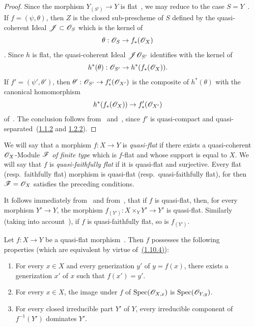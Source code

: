 \begin{proof}
Since the morphism $Y_{(S')}\to Y$ is flat~, we may reduce to the case $S=Y$~.
If $f=(\psi,\theta)$, then $Z$ is the closed sub-prescheme of $S$ defined by the quasi-coherent Ideal $\mathscr{J}\subset\mathscr{O}_S$ which is the kernel of
\[
  \theta:\mathscr{O}_S\to f_*(\mathscr{O}_X)
\]
.
Since $h$ is flat, the quasi-coherent Ideal $\mathscr{J}\mathscr{O}_{S'}$ identifies with the kernel of
\[
  h^*(\theta):\mathscr{O}_{S'}\to h^*(f_*(\mathscr{O}_X)).
\]
If $f'=(\psi',\theta')$, then $\theta':\mathscr{O}_{S'}\to f'_*(\mathscr{O}_{X'})$ is the composite of $h^*(\theta)$ with the canonical homomorphism
\[
  h^*(f_*(\mathscr{O}_X))\to f'_*(\mathscr{O}_{X'})
\]
of~.
The conclusion follows from~ and~, since $f'$ is quasi-compact and quasi-separated~({\hyperref[IV.1.1.2]{1.1.2}} and {\hyperref[IV.1.2.2]{1.2.2}}).
\end{proof}

\begin{env}[2.3.3]
\label{IV.2.3.3}
We will say that a morphism $f:X\to Y$ is \emph{quasi-flat} if there exists a quasi-coherent $\mathscr{O}_X$-Module $\mathscr{F}$ \emph{of finite type} which is $f$-flat and whose support is equal to $X$.
We will say that $f$ is \emph{quasi-faithfully flat} if it is quasi-flat and surjective.
Every flat (resp.\ faithfully flat) morphism is quasi-flat (resp.\ quasi-faithfully flat), for then $\mathscr{F}=\mathscr{O}_X$ satisfies the preceding conditions.
\end{env}

It follows immediately from~ and from~, that if $f$ is quasi-flat, then, for every morphism $Y'\to Y$, the morphism $f_{(Y')}:X\times_Y Y'\to Y'$ is quasi-flat.
Similarly (taking into account~), if $f$ is quasi-faithfully flat, so is $f_{(Y')}$.

\begin{proposition}[2.3.4]
\label{IV.2.3.4}
Let $f:X\to Y$ be a quasi-flat morphism~. Then $f$ possesses the following properties \textnormal{(}which are equivalent by virtue of~{\hyperref[IV.1.10.4]{(1.10.4)}}\textnormal{)}:
\begin{enumerate}
  \item[(i)] For every $x\in X$ and every generization $y'$ of $y=f(x)$, there exists a generization $x'$ of $x$ such that $f(x')=y'$.
  \item[(ii)] For every $x\in X$, the image under $f$ of $\operatorname{Spec}(\mathscr{O}_{X,x})$ is $\operatorname{Spec}(\mathscr{O}_{Y,y})$.
  \item[\emph{(iii)}] For every closed irreducible part $Y'$ of $Y$, every irreducible component of $f^{-1}(Y')$ dominates $Y'$.
\end{enumerate}
\end{proposition}


